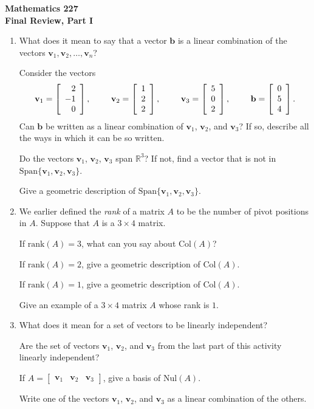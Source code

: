 \documentclass[12pt]{article}
\newcommand{\vs}[1]{\vspace{#1in}}
\newcommand{\bvec}{{\mathbf b}}
\newcommand{\vvec}{{\mathbf v}}
\newcommand{\real}{{\mathbb R}}
\newcommand{\threevec}[3]{\left[\begin{array}{r}#1 \\ #2 \\ #3
  \end{array}\right]}
\renewcommand{\span}[1]{\text{Span}\{#1\}}
\newcommand{\rank}{\text{rank}}
\newcommand{\col}{\text{Col}}
\newcommand{\nul}{\text{Nul}}
\begin{document}
\noindent
{\bf Mathematics 227} \\ 
{\bf Final Review, Part I}

\begin{enumerate}
\item What does it mean to say that a vector $\bvec$ is a linear
  combination of the vectors $\vvec_1,\vvec_2,\ldots,\vvec_n$?

  \vs{1}
  Consider the vectors
  $$
  \vvec_1=\threevec2{-1}0, \hspace*{24pt}
  \vvec_2=\threevec122, \hspace*{24pt}
  \vvec_3=\threevec502, \hspace*{24pt}
  \bvec=\threevec054.
  $$
  Can $\bvec$ be written as a linear combination of $\vvec_1$,
  $\vvec_2$, and $\vvec_3$?  If so, describe all the ways in which it
  can be so written.

  \vs{2}
  Do the vectors $\vvec_1$, $\vvec_2$, $\vvec_3$ span $\real^3$?  If
  not, find a vector that is not in $\span{\vvec_1,\vvec_2,\vvec_3}$.

  \vs{1.5}
  Give a geometric description of $\span{\vvec_1,\vvec_2,\vvec_3}$.

  \vs{1}
  \newpage
\item We earlier defined the {\em rank} of a matrix $A$ to be the
  number of pivot positions in $A$.  Suppose that $A$ is a $3\times4$
  matrix.

  If $\rank(A) = 3$, what can you say about $\col(A)$?

  \vs{1}
  If $\rank(A) = 2$, give a geometric description of $\col(A)$.

  \vs{1}
  If $\rank(A) = 1$, give a geometric description of $\col(A)$.

  \vs{1}
  Give an example of a $3\times4$ matrix $A$ whose rank is $1$.

  \vs{1}
\item What does it mean for a set of vectors to be linearly
  independent?

  \vs{1}
  Are the set of vectors $\vvec_1$, $\vvec_2$, and $\vvec_3$ from the
  last part of this activity linearly independent?

  \vs{1}
  \newpage
  If $A =
  \left[\begin{array}{ccc}\vvec_1&\vvec_2&\vvec_3\end{array}\right]$,
  give a basis of $\nul(A)$.

  \vs{1}
  Write one of the vectors $\vvec_1$, $\vvec_2$, and $\vvec_3$ as a
  linear combination of the others. 


\end{enumerate}
\end{document}

